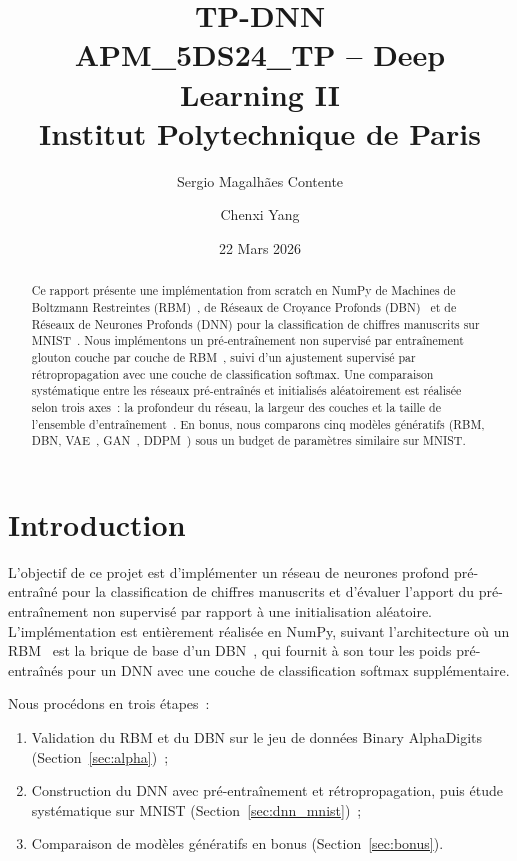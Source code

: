 \documentclass[11pt,a4paper]{article}
\title{\textbf{TP-DNN}\\[0.3cm]
\large APM\_5DS24\_TP -- Deep Learning II\\
Institut Polytechnique de Paris}
\author{Sergio Magalh\~{a}es Contente \and Chenxi Yang}
\date{22 Mars 2026}
\begin{document}
\maketitle

\begin{abstract}
Ce rapport pr\'esente une impl\'ementation from scratch en NumPy de Machines de Boltzmann Restreintes (RBM)~\cite{smolensky1986}, de R\'eseaux de Croyance Profonds (DBN)~\cite{hinton2006} et de R\'eseaux de Neurones Profonds (DNN) pour la classification de chiffres manuscrits sur MNIST~\cite{lecun1998}.
Nous impl\'ementons un pr\'e-entra\^inement non supervis\'e par entra\^inement glouton couche par couche de RBM~\cite{bengio2007}, suivi d'un ajustement supervis\'e par r\'etropropagation avec une couche de classification softmax.
Une comparaison syst\'ematique entre les r\'eseaux pr\'e-entra\^in\'es et initialis\'es al\'eatoirement est r\'ealis\'ee selon trois axes~: la profondeur du r\'eseau, la largeur des couches et la taille de l'ensemble d'entra\^inement~\cite{erhan2010}.
En bonus, nous comparons cinq mod\`eles g\'en\'eratifs (RBM, DBN, VAE~\cite{kingma2014}, GAN~\cite{goodfellow2014}, DDPM~\cite{ho2020}) sous un budget de param\`etres similaire sur MNIST.
\end{abstract}

\newpage
\tableofcontents
\newpage

\section{Introduction}

L'objectif de ce projet est d'impl\'ementer un r\'eseau de neurones profond pr\'e-entra\^in\'e pour la classification de chiffres manuscrits et d'\'evaluer l'apport du pr\'e-entra\^inement non supervis\'e par rapport \`a une initialisation al\'eatoire.
L'impl\'ementation est enti\`erement r\'ealis\'ee en NumPy, suivant l'architecture o\`u un RBM~\cite{smolensky1986} est la brique de base d'un DBN~\cite{hinton2006}, qui fournit \`a son tour les poids pr\'e-entra\^in\'es pour un DNN avec une couche de classification softmax suppl\'ementaire.

Nous proc\'edons en trois \'etapes~:
\begin{enumerate}
    \item Validation du RBM et du DBN sur le jeu de donn\'ees Binary AlphaDigits (Section~\ref{sec:alpha})~;
    \item Construction du DNN avec pr\'e-entra\^inement et r\'etropropagation, puis \'etude syst\'ematique sur MNIST (Section~\ref{sec:dnn_mnist})~;
    \item Comparaison de mod\`eles g\'en\'eratifs en bonus (Section~\ref{sec:bonus}).
\end{enumerate}
\end{document}
